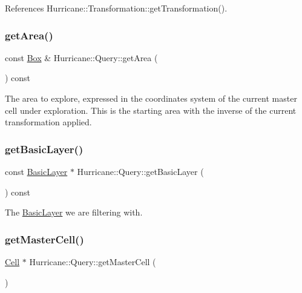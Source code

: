References Hurricane\+::\+Transformation\+::get\+Transformation().

\mbox{\label{classHurricane_1_1Query_a666c44432d3f5717f2fee5f57a281bdd}} 
\subsubsection{\texorpdfstring{get\+Area()}{getArea()}}
{\footnotesize\ttfamily const \hyperlink{classHurricane_1_1Box}{Box} \& Hurricane\+::\+Query\+::get\+Area (\begin{DoxyParamCaption}{ }\end{DoxyParamCaption}) const\hspace{0.3cm}{\ttfamily [inline]}}

The area to explore, expressed in the coordinates system of the current master cell under exploration. This is the starting area with the inverse of the current transformation applied. \mbox{\label{classHurricane_1_1Query_ac683152bccef813184e572806e4c14f4}} 
\subsubsection{\texorpdfstring{get\+Basic\+Layer()}{getBasicLayer()}}
{\footnotesize\ttfamily const \hyperlink{classHurricane_1_1BasicLayer}{Basic\+Layer} $\ast$ Hurricane\+::\+Query\+::get\+Basic\+Layer (\begin{DoxyParamCaption}{ }\end{DoxyParamCaption}) const\hspace{0.3cm}{\ttfamily [inline]}}

The \hyperlink{classHurricane_1_1BasicLayer}{Basic\+Layer} we are filtering with. \mbox{\label{classHurricane_1_1Query_add13f7ff193df6ce5223f9761b6cba69}} 
\subsubsection{\texorpdfstring{get\+Master\+Cell()}{getMasterCell()}}
{\footnotesize\ttfamily \hyperlink{classHurricane_1_1Cell}{Cell} $\ast$ Hurricane\+::\+Query\+::get\+Master\+Cell (\begin{DoxyParamCaption}{ }\end{DoxyParamCaption})\hspace{0.3cm}{\ttfamily [inline]}}

